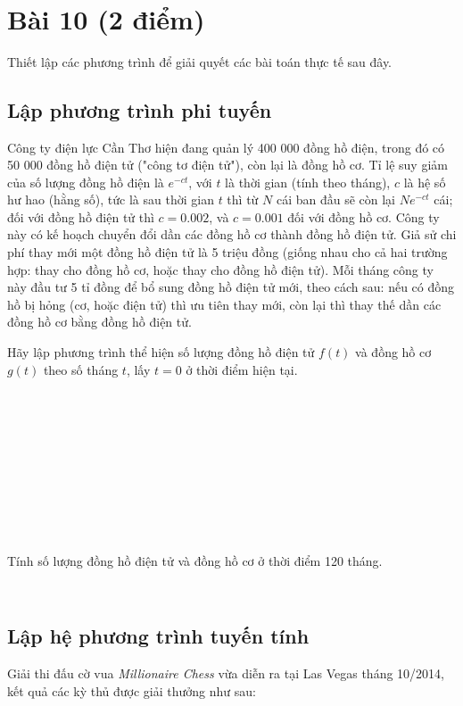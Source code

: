 \documentclass[12pt]{article}
\begin{document}
\begin{verbatim}








\end{verbatim}

\section{Bài 10 (2 điểm)}
Thiết lập các phương trình để giải quyết các bài toán thực tế sau đây.
\subsection{Lập phương trình phi tuyến}
Công ty điện lực Cần Thơ hiện đang quản lý 400 000 đồng hồ điện, trong đó có 50 000 đồng hồ điện tử ("công tơ điện tử"), còn lại là đồng hồ cơ. Tỉ lệ suy giảm của số lượng đồng hồ điện là $e^{-ct}$, với $t$ là thời gian (tính theo tháng), $c$ là hệ số hư hao (hằng số), tức là sau thời gian $t$ thì từ $N$ cái ban đầu sẽ còn lại $Ne^{-ct}$ cái; đối với đồng hồ điện tử thì $c=0.002$, và $c=0.001$ đối với đồng hồ cơ. Công ty này có kế hoạch chuyển đổi dần các đồng hồ cơ thành đồng hồ điện tử. Giả sử chi phí thay mới một đồng hồ điện tử là 5 triệu đồng (giống nhau cho cả hai trường hợp: thay cho đồng hồ cơ, hoặc thay cho đồng hồ điện tử). Mỗi tháng công ty này đầu tư 5 tỉ đồng để bổ sung đồng hồ điện tử mới, theo cách sau: nếu có đồng hồ bị hỏng (cơ, hoặc điện tử) thì ưu tiên thay mới, còn lại thì thay thế dần các đồng hồ cơ bằng đồng hồ điện tử.

Hãy lập phương trình thể hiện số lượng đồng hồ điện tử $f(t)$ và đồng hồ cơ $g(t)$ theo số tháng $t$, lấy $t=0$ ở thời điểm hiện tại.

\begin{verbatim}











\end{verbatim}

Tính số lượng đồng hồ điện tử và đồng hồ cơ ở thời điểm 120 tháng.

\begin{verbatim}


\end{verbatim}

\subsection{Lập hệ phương trình tuyến tính}
Giải thi đấu cờ vua \emph{Millionaire Chess} vừa diễn ra tại Las Vegas tháng 10/2014, kết quả các kỳ thủ được giải thưởng như sau:
\end{document}
